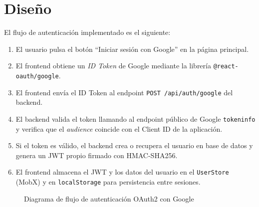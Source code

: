 \section{Diseño}

El flujo de autenticación implementado es el siguiente:

\begin{enumerate}
    \item El usuario pulsa el botón ``Iniciar sesión con Google'' en la página principal.
    \item El frontend obtiene un \textit{ID Token} de Google mediante la librería \texttt{@react-oauth/google}.
    \item El frontend envía el ID Token al endpoint \texttt{POST /api/auth/google} del backend.
    \item El backend valida el token llamando al endpoint público de Google \texttt{tokeninfo} y verifica que el \textit{audience} coincide con el Client ID de la aplicación.
    \item Si el token es válido, el backend crea o recupera el usuario en base de datos y genera un JWT propio firmado con HMAC-SHA256.
    \item El frontend almacena el JWT y los datos del usuario en el \texttt{UserStore} (MobX) y en \texttt{localStorage} para persistencia entre sesiones.
\end{enumerate}

\begin{figure}[htbp]
\begin{center}
\caption{Diagrama de flujo de autenticación OAuth2 con Google}
\label{fig:diseno01}
\end{center}
\end{figure}

